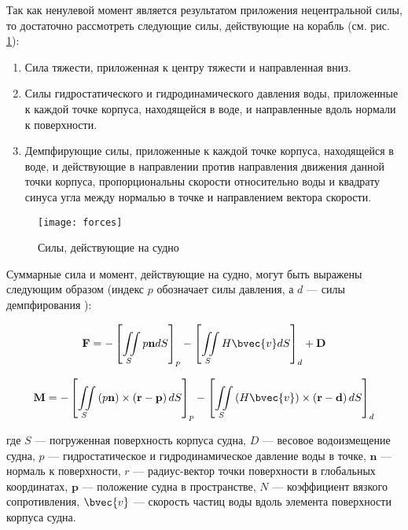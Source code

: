Так как ненулевой момент является результатом приложения нецентральной силы, то достаточно рассмотреть следующие силы, действующие на корабль (см. рис. \ref{boat_forces}):
\begin{enumerate}
	\item	Сила тяжести, приложенная к центру тяжести и 
			направленная вниз.
	\item	Силы гидростатического и гидродинамического давления воды, приложенные к каждой точке корпуса, 
			находящейся в воде, и направленные вдоль нормали к поверхности.
	\item	Демпфирующие силы, приложенные к каждой точке корпуса, 
			находящейся в воде, и действующие в направлении против 
			направления движения  данной точки корпуса, пропорциональны скорости 
			относительно воды и квадрату синуса угла между нормалью в точке и направлением 
			вектора скорости.
\end{enumerate}

\begin{figure}[ht]
\begin{center}
\texttt{[image: forces]}
\end{center}
\caption{Силы, действующие на судно}
\label{boat_forces}
\end{figure}

Суммарные сила и момент, действующие на судно, могут быть выражены следующим образом (индекс $p$ обозначает силы давления, а $d$ --- силы демпфирования ):

\begin{equation}
	\mathbf{F} = 
		-\left[ \iint\limits_{S} p \mathbf{n} dS 	\right]_{p}
		-\left[ \iint\limits_{S} H \bvec{v} dS 	\right]_{d}
		+ \mathbf{D}
	\label{F=integral}
\end{equation}

\begin{equation}
	\mathbf{M} = 
	-\left[ 
		\iint\limits_{S} 
		\left( p \mathbf{n} \right) \times 
		\left( \mathbf{r} - \mathbf{p} \right) dS	
	\right]_{p}
	-\left[ \iint\limits_{S} 
		\left( H \bvec{v} \right) \times 
		\left( \mathbf{r} - \mathbf{d} \right) dS	
	\right]_{d}
	\label{M=integral}
\end{equation}

где $S$ --- погруженная поверхность корпуса судна, $D$ --- весовое водоизмещение судна, $p$ --- гидростатическое и гидродинамическое давление воды в точке, $\mathbf{n}$ --- нормаль к поверхности, $r$ --- радиус-вектор точки поверхности в глобальных координатах, $\mathbf{p}$ --- положение судна в пространстве, $N$ --- коэффициент вязкого сопротивления, $\bvec{v}$ --- скорость частиц воды вдоль элемента поверхности корпуса судна.

